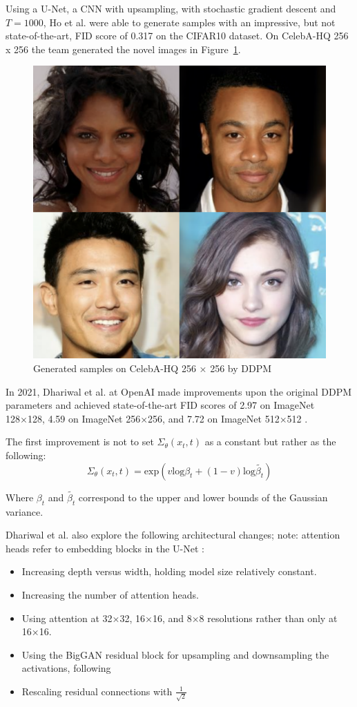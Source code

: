 \documentclass[%
 reprint,
 amsmath,amssymb,
 aps,
]{revtex4-2}
\begin{document}
Using a U-Net, a CNN with upsampling, with stochastic gradient descent and $T=1000$, Ho et al. were able to generate samples with an impressive, but not state-of-the-art, FID score of 0.317 on the CIFAR10 dataset. On CelebA-HQ 256 x 256 the team generated the novel images in Figure~\ref{fig:DDPMCeleb}.

\begin{figure}[h]
    \includegraphics[width=0.6\columnwidth]{celeb.png}
    \caption{\label{fig:DDPMCeleb} Generated samples on CelebA-HQ 256 × 256 by DDPM \cite{ho2020denoising}}
\end{figure}



In 2021, Dhariwal et al. at OpenAI made improvements upon the original DDPM parameters and achieved state-of-the-art FID scores of 2.97 on ImageNet 128×128, 4.59 on ImageNet 256×256, and 7.72 on ImageNet 512×512 \cite{dhariwal2021diffusion}.

The first improvement is not to set $\Sigma_\theta(x_t, t) $ as a constant but rather as the following:
\begin{equation}
\Sigma_\theta(x_t, t) = \mathrm{exp}(v \mathrm{log} \beta_t + (1 - v) \mathrm{log} \tilde{\beta_t})
\end{equation}


Where $\beta_t$ and  $\tilde{\beta_t}$ correspond to the upper and lower bounds of the Gaussian variance.


Dhariwal et al. also explore the following architectural changes; note: attention heads refer to embedding blocks in the U-Net  \cite{dhariwal2021diffusion}:
\begin{itemize}
\item Increasing depth versus width, holding model size relatively constant.
\item Increasing the number of attention heads.
\item Using attention at 32×32, 16×16, and 8×8 resolutions rather than only at 16×16.
\item Using the BigGAN residual block for upsampling and downsampling the activations, following
\item Rescaling residual connections with $\frac{1}{\sqrt{2}}$
\end{itemize}
\end{document}
